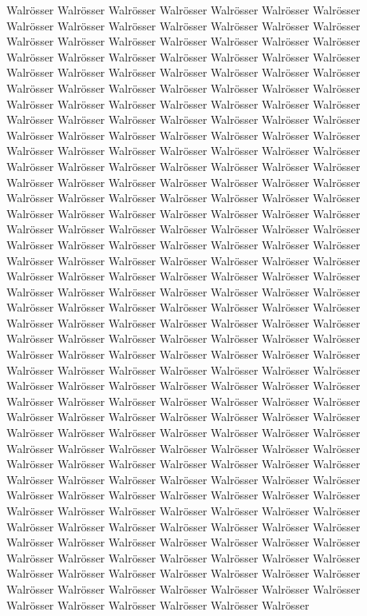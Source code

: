 \documentclass[a4paper, twoside, 12pt]{report}
\begin{document}
Walr\"osser Walr\"osser Walr\"osser Walr\"osser Walr\"osser Walr\"osser Walr\"osser Walr\"osser Walr\"osser Walr\"osser Walr\"osser Walr\"osser Walr\"osser Walr\"osser Walr\"osser Walr\"osser Walr\"osser Walr\"osser Walr\"osser Walr\"osser Walr\"osser Walr\"osser Walr\"osser Walr\"osser Walr\"osser Walr\"osser Walr\"osser Walr\"osser Walr\"osser Walr\"osser Walr\"osser Walr\"osser Walr\"osser Walr\"osser Walr\"osser Walr\"osser Walr\"osser Walr\"osser Walr\"osser Walr\"osser Walr\"osser Walr\"osser Walr\"osser Walr\"osser Walr\"osser Walr\"osser Walr\"osser Walr\"osser Walr\"osser Walr\"osser Walr\"osser Walr\"osser Walr\"osser Walr\"osser Walr\"osser Walr\"osser Walr\"osser Walr\"osser Walr\"osser Walr\"osser Walr\"osser Walr\"osser Walr\"osser Walr\"osser Walr\"osser Walr\"osser Walr\"osser Walr\"osser Walr\"osser Walr\"osser Walr\"osser Walr\"osser Walr\"osser Walr\"osser Walr\"osser Walr\"osser Walr\"osser Walr\"osser Walr\"osser Walr\"osser  Walr\"osser Walr\"osser Walr\"osser Walr\"osser Walr\"osser Walr\"osser Walr\"osser Walr\"osser Walr\"osser Walr\"osser Walr\"osser Walr\"osser Walr\"osser Walr\"osser Walr\"osser Walr\"osser Walr\"osser Walr\"osser Walr\"osser Walr\"osser Walr\"osser Walr\"osser Walr\"osser Walr\"osser Walr\"osser Walr\"osser Walr\"osser Walr\"osser Walr\"osser Walr\"osser Walr\"osser Walr\"osser Walr\"osser Walr\"osser Walr\"osser Walr\"osser Walr\"osser Walr\"osser Walr\"osser Walr\"osser Walr\"osser Walr\"osser Walr\"osser Walr\"osser Walr\"osser Walr\"osser Walr\"osser Walr\"osser Walr\"osser Walr\"osser Walr\"osser Walr\"osser Walr\"osser Walr\"osser Walr\"osser Walr\"osser Walr\"osser Walr\"osser Walr\"osser Walr\"osser Walr\"osser Walr\"osser Walr\"osser Walr\"osser Walr\"osser Walr\"osser Walr\"osser Walr\"osser Walr\"osser Walr\"osser Walr\"osser Walr\"osser Walr\"osser Walr\"osser Walr\"osser Walr\"osser Walr\"osser Walr\"osser Walr\"osser Walr\"osser Walr\"osser Walr\"osser Walr\"osser Walr\"osser Walr\"osser Walr\"osser Walr\"osser Walr\"osser Walr\"osser Walr\"osser Walr\"osser Walr\"osser Walr\"osser Walr\"osser Walr\"osser Walr\"osser Walr\"osser Walr\"osser Walr\"osser Walr\"osser  Walr\"osser Walr\"osser Walr\"osser Walr\"osser Walr\"osser Walr\"osser Walr\"osser Walr\"osser Walr\"osser Walr\"osser Walr\"osser Walr\"osser Walr\"osser Walr\"osser Walr\"osser Walr\"osser Walr\"osser Walr\"osser Walr\"osser Walr\"osser Walr\"osser Walr\"osser Walr\"osser Walr\"osser Walr\"osser Walr\"osser Walr\"osser Walr\"osser Walr\"osser Walr\"osser Walr\"osser Walr\"osser Walr\"osser Walr\"osser Walr\"osser Walr\"osser Walr\"osser Walr\"osser Walr\"osser Walr\"osser Walr\"osser Walr\"osser Walr\"osser Walr\"osser Walr\"osser Walr\"osser Walr\"osser Walr\"osser Walr\"osser Walr\"osser Walr\"osser Walr\"osser Walr\"osser Walr\"osser Walr\"osser Walr\"osser Walr\"osser Walr\"osser Walr\"osser Walr\"osser Walr\"osser Walr\"osser Walr\"osser Walr\"osser Walr\"osser Walr\"osser Walr\"osser Walr\"osser Walr\"osser Walr\"osser Walr\"osser Walr\"osser Walr\"osser Walr\"osser Walr\"osser Walr\"osser Walr\"osser Walr\"osser Walr\"osser Walr\"osser Walr\"osser Walr\"osser Walr\"osser Walr\"osser Walr\"osser Walr\"osser Walr\"osser Walr\"osser Walr\"osser Walr\"osser Walr\"osser Walr\"osser 
\end{document}
